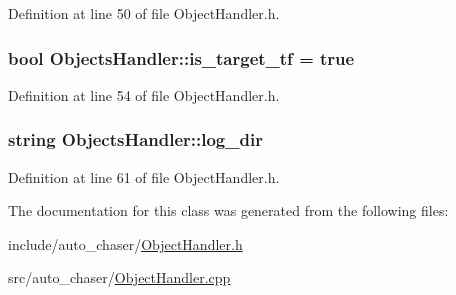 Definition at line 50 of file Object\+Handler.\+h.

\subsubsection[{\texorpdfstring{is\+\_\+target\+\_\+tf}{is_target_tf}}]{\setlength{\rightskip}{0pt plus 5cm}bool Objects\+Handler\+::is\+\_\+target\+\_\+tf = true}\hypertarget{class_objects_handler_a98d5880c9ab3a4b227d8c57403213f65}{}\label{class_objects_handler_a98d5880c9ab3a4b227d8c57403213f65}


Definition at line 54 of file Object\+Handler.\+h.

\subsubsection[{\texorpdfstring{log\+\_\+dir}{log_dir}}]{\setlength{\rightskip}{0pt plus 5cm}string Objects\+Handler\+::log\+\_\+dir}\hypertarget{class_objects_handler_a057b7b0a2fa3eca3a83b0d8de54e0f60}{}\label{class_objects_handler_a057b7b0a2fa3eca3a83b0d8de54e0f60}


Definition at line 61 of file Object\+Handler.\+h.



The documentation for this class was generated from the following files\+:\begin{DoxyCompactItemize}
\item 
include/auto\+\_\+chaser/\hyperlink{_object_handler_8h}{Object\+Handler.\+h}\item 
src/auto\+\_\+chaser/\hyperlink{_object_handler_8cpp}{Object\+Handler.\+cpp}\end{DoxyCompactItemize}
